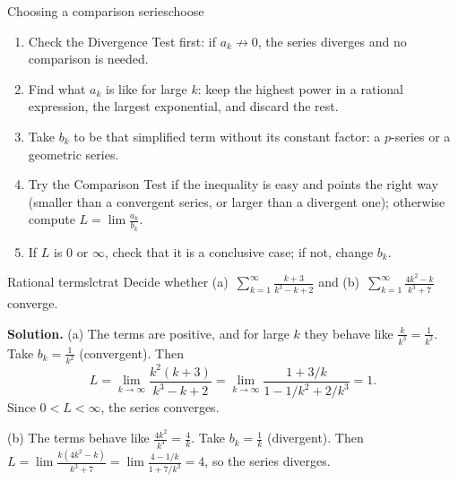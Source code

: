 \documentclass[11pt]{article}
\begin{document}
\begin{proc}{Choosing a comparison series}{choose}
\begin{enumerate}[nosep]
  \item Check the Divergence Test first: if $a_k\not\to0$, the series diverges and no comparison is needed.
  \item Find what $a_k$ is like for large $k$: keep the highest power in a rational expression, the largest exponential, and discard the rest.
  \item Take $b_k$ to be that simplified term without its constant factor: a $p$-series or a geometric series.
  \item Try the Comparison Test if the inequality is easy and points the right way (smaller than a convergent series, or larger than a divergent one); otherwise compute $L=\lim\frac{a_k}{b_k}$.
  \item If $L$ is $0$ or $\infty$, check that it is a conclusive case; if not, change $b_k$.
\end{enumerate}
\end{proc}

\begin{exmp}{Rational terms}{lctrat}
Decide whether (a)~$\displaystyle\sum_{k=1}^\infty\frac{k+3}{k^3-k+2}$ and (b)~$\displaystyle\sum_{k=1}^\infty\frac{4k^2-k}{k^3+7}$ converge.

\textbf{Solution.} (a) The terms are positive, and for large $k$ they behave like $\frac k{k^3}=\frac1{k^2}$. Take $b_k=\frac1{k^2}$ (convergent). Then
\[
L=\lim_{k\to\infty}\frac{k^2(k+3)}{k^3-k+2}=\lim_{k\to\infty}\frac{1+3/k}{1-1/k^2+2/k^3}=1 .
\]
Since $0<L<\infty$, the series converges.

(b) The terms behave like $\frac{4k^2}{k^3}=\frac4k$. Take $b_k=\frac1k$ (divergent). Then $L=\lim\frac{k(4k^2-k)}{k^3+7}=\lim\frac{4-1/k}{1+7/k^3}=4$, so the series diverges.
\end{exmp}
\end{document}
